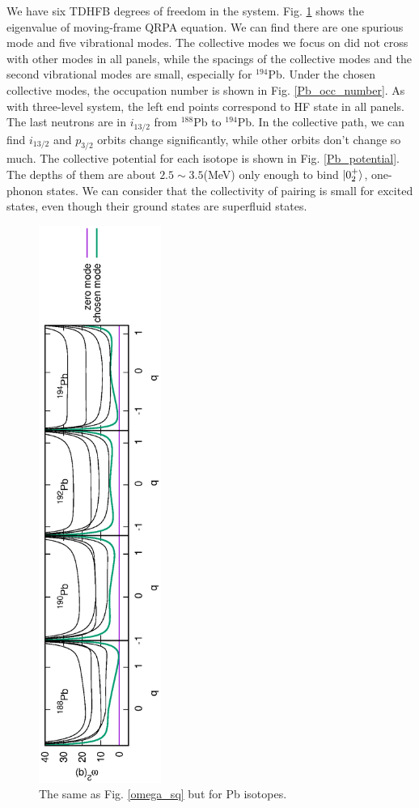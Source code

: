 \documentclass[%
superscriptaddress,
showpacs,
nofootinbib,
amsmath,amssymb,
aps,
prc,
twocolumn,
floatfix ]%
{revtex4-1}
\begin{document}
We have six TDHFB degrees of freedom in the system. Fig. \ref{Pb_omega_sq} shows the eigenvalue of moving-frame QRPA equation. We can find there are one spurious mode and five vibrational modes. The collective modes we focus on did not cross with other modes in all panels, while the spacings of the collective modes and the second vibrational modes are small, especially for ${}^{194}$Pb. Under the chosen collective modes, the occupation number is shown in Fig. \ref{Pb_occ_number}. As with three-level system, the left end points correspond to HF state in all panels. The last neutrons are in $i_{13/2}$ from ${}^{188}$Pb to ${}^{194}$Pb. In the collective path, we can find $i_{13/2}$ and $p_{3/2}$ orbits change significantly, while other orbits don't change so much. The collective potential for each isotope is shown in Fig. \ref{Pb_potential}. The depths of them are about $2.5\sim3.5$(MeV) only enough to bind $\ket{0_2^+}$, one-phonon states. We can consider that the collectivity of pairing is small for excited states, even though their ground states are superfluid states.
\begin{figure}[t]
 \begin{center}
  \includegraphics[width=40mm,angle=-90]{Pbomega_sq.eps}
 \end{center}
	\caption{The same as Fig. \ref{omega_sq} but for Pb isotopes.
}
 \label{Pb_omega_sq}
\end{figure}
\end{document}
